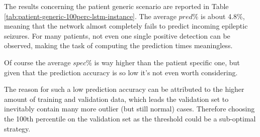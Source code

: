 The results concerning the patient generic scenario are reported in Table \ref{tab:patient-generic-100perc-lstm-instance}. 
The average $pred\%$ is about 4.8\%, meaning that the network almost completely fails to predict incoming epileptic seizures.
For many patients, not even one single positive detection can be observed, making the task of computing the prediction times meaningless.

Of course the average $spec\%$ is way higher than the patient specific one, but given that the prediction accuracy is so low it's not even worth considering.

The reason for such a low prediction accuracy can be attributed to the higher amount of training and validation data, which leads the validation set to inevitably contain many more outlier (but still normal) cases. Therefore choosing the 100th percentile on the validation set as the threshold could be a sub-optimal strategy.


